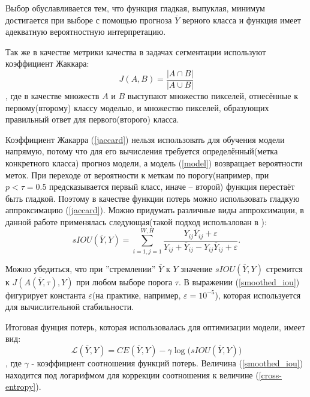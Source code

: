 \documentclass[14pt, a4paper, oneside, bold]{extarticle}
\begin{document}
Выбор обуславливается тем, что функция гладкая, выпуклая, минимум достигается 
при выборе с помощью прогноза $\overline{Y}$ верного класса и функция 
имеет адекватную вероятностную интерпретацию.

Так же в качестве метрики качества в задачах сегментации используют коэффициент Жаккара: 
\begin{equation} \label{jaccard}
	J(A, B) = \frac{|A \cap B|}{|A \cup B|} 
\end{equation}
, где в качестве множеств $A$ и $B$ выступают множество пикселей, отнесённые к 
первому(второму) классу моделью, и множество пикселей, образующих правильный ответ для первого(второго) класса.

Коэффициент Жакарра (\ref{jaccard}) нельзя использовать для обучения модели напрямую, потому что для его вычисления требуется определённый(метка конкретного класса) прогноз модели, а модель 
(\ref{model}) возвращает вероятности меток. При переходе от вероятности к меткам по порогу(например, при $p< \tau=0.5$ предсказывается первый класс, иначе -- второй) функция перестаёт быть гладкой. Поэтому в качестве функции потерь можно использовать гладкую аппроксимацию (\ref{jaccard}). Можно придумать различные виды аппроксимации, в данной работе применялась следующая(такой подход использлован в \cite{20}):
\begin{equation} \label{smoothed_iou}
	sIOU(\overline{Y}, Y) = \sum \limits_{i=1, j=1}^{W, H}
		\frac{Y_{ij} \overline{Y}_{ij} + \varepsilon}
		{Y_{ij} + \overline{Y}_{ij} 
			- Y_{ij} \overline{Y}_{ij} + \varepsilon}.
\end{equation} 
 
Можно убедиться, что при ''стремлении'' 
$\overline{Y}$ к $Y$ значение $sIOU(\overline{Y}, Y)$ стремится к $J(A(\overline{Y}, \tau), Y)$ при любом выборе порога $\tau$. В выражении (\ref{smoothed_iou}) фигурирует 
константа $\varepsilon$(на практике, например, $\varepsilon=10^{-5}$), которая используется для вычислительной стабильности.
 
Итоговая фунция потерь, которая использовалась для оптимизации модели, имеет вид:
\begin{equation} \label{final_loss}
	\mathcal{L}(\overline{Y}, Y) = CE(\overline{Y}, Y)
		- \gamma \log \bigl( sIOU(\overline{Y}, Y) \bigr)
\end{equation}
, где $\gamma$ - коэффициент соотношения функций потерь. Величина (\ref{smoothed_iou}) находится под логарифмом для коррекции соотношения к величине (\ref{cross-entropy}).
\end{document}
